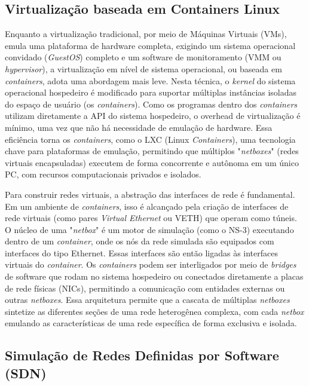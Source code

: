\subsection{Virtualização baseada em Containers Linux}

Enquanto a virtualização tradicional, por meio de Máquinas Virtuais (VMs), emula uma plataforma de hardware completa, exigindo um sistema operacional convidado (\textit{GuestOS}) completo e um software de monitoramento (VMM ou \textit{hypervisor}), a virtualização em nível de sistema operacional, ou baseada em \textit{containers}, adota uma abordagem mais leve. Nesta técnica, o \textit{kernel} do sistema operacional hospedeiro é modificado para suportar múltiplas instâncias isoladas do espaço de usuário (os \textit{containers}). Como os programas dentro dos \textit{containers} utilizam diretamente a API do sistema hospedeiro, o overhead de virtualização é mínimo, uma vez que não há necessidade de emulação de hardware. Essa eficiência torna os \textit{containers}, como o LXC (Linux \textit{Containers}), uma tecnologia chave para plataformas de emulação, permitindo que múltiplos "\textit{netboxes}" (redes virtuais encapsuladas) executem de forma concorrente e autônoma em um único PC, com recursos computacionais privados e isolados.

Para construir redes virtuais, a abstração das interfaces de rede é fundamental. Em um ambiente de \textit{containers}, isso é alcançado pela criação de interfaces de rede virtuais (como pares \textit{Virtual Ethernet} ou VETH) que operam como túneis. O núcleo de uma "\textit{netbox}" é um motor de simulação (como o NS-3) executando dentro de um \textit{container}, onde os nós da rede simulada são equipados com interfaces do tipo Ethernet. Essas interfaces são então ligadas às interfaces virtuais do \textit{container}. Os \textit{containers} podem ser interligados por meio de \textit{bridges} de software que rodam no sistema hospedeiro ou conectados diretamente a placas de rede físicas (NICs), permitindo a comunicação com entidades externas ou outras \textit{netboxes}. Essa arquitetura permite que a cascata de múltiplas \textit{netboxes} sintetize as diferentes seções de uma rede heterogênea complexa, com cada \textit{netbox} emulando as características de uma rede específica de forma exclusiva e isolada.

\subsection{Simulação de Redes Definidas por Software (SDN)}

